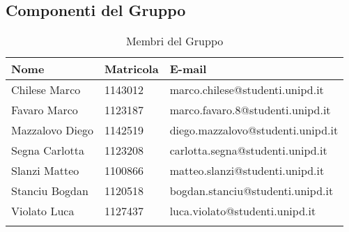 \subsection{Componenti del Gruppo}

\begin{longtable}{|C{.25\textwidth}|C{.16\textwidth}|C{.45\textwidth}|}
\hline
\textbf{Nome} & \textbf{Matricola} & \textbf{E-mail}\\
\hline \hline
\endfirsthead
Chilese Marco & 1143012 & marco.chilese@studenti.unipd.it \\
\hline
Favaro Marco & 1123187 & marco.favaro.8@studenti.unipd.it \\
\hline
Mazzalovo Diego & 1142519 & diego.mazzalovo@studenti.unipd.it \\
\hline
Segna Carlotta & 1123208 & carlotta.segna@studenti.unipd.it \\
\hline
Slanzi Matteo & 1100866 & matteo.slanzi@studenti.unipd.it \\
\hline
Stanciu Bogdan & 1120518 & bogdan.stanciu@studenti.unipd.it \\
\hline
Violato Luca & 1127437 & luca.violato@studenti.unipd.it \\
\hline
\caption{Membri del Gruppo}
\label{Tabella Membri del Gruppo}
\end{longtable}
